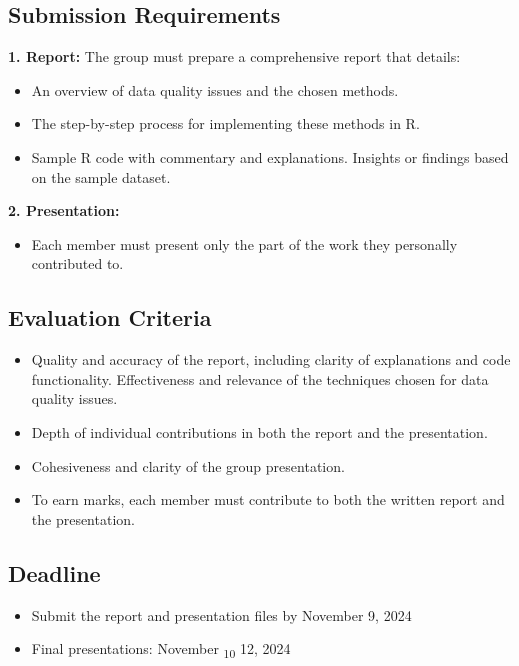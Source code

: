 \documentclass[
  letterpaper,
  DIV=11,
  numbers=noendperiod]{scrreprt}
\providecommand{\tightlist}{%
  \setlength{\itemsep}{0pt}\setlength{\parskip}{0pt}}\usepackage{longtable,booktabs,array}
\begin{document}
\subsection{Submission Requirements}\label{submission-requirements}

\textbf{1. Report:} The group must prepare a comprehensive report that
details:

\begin{itemize}
\item
  An overview of data quality issues and the chosen methods.
\item
  The step-by-step process for implementing these methods in R.
\item
  Sample R code with commentary and explanations. Insights or findings
  based on the sample dataset.
\end{itemize}

\textbf{2. Presentation:}

\begin{itemize}
\tightlist
\item
  Each member must present only the part of the work they personally
  contributed to.
\end{itemize}

\subsection{Evaluation Criteria}\label{evaluation-criteria}

\begin{itemize}
\item
  Quality and accuracy of the report, including clarity of explanations
  and code functionality. Effectiveness and relevance of the techniques
  chosen for data quality issues.
\item
  Depth of individual contributions in both the report and the
  presentation.
\item
  Cohesiveness and clarity of the group presentation.
\item
  To earn marks, each member must contribute to both the written report
  and the presentation.
\end{itemize}

\subsection{Deadline}\label{deadline}

\begin{itemize}
\item
  Submit the report and presentation files by November 9, 2024
\item
  Final presentations: November \textsubscript{10} 12, 2024
\end{itemize}
\end{document}
